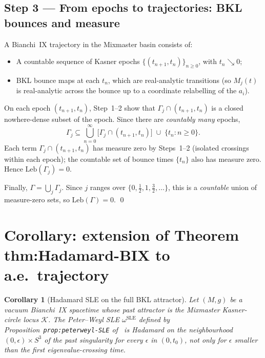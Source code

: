 \documentclass[11pt]{article}
\newtheorem{corollary}[lemma]{Corollary}
\theoremstyle{definition}
\newcommand{\KK}{\mathcal{K}}
\begin{document}
\subsection{Step 3 --- From epochs to trajectories: BKL bounces and measure}

A Bianchi~IX trajectory in the Mixmaster basin consists of:
\begin{itemize}
  \item A countable sequence of Kasner epochs $\{(t_{n+1},t_n)\}_{n\ge 0}$,
    with $t_n \searrow 0$;
  \item BKL bounce maps at each $t_n$, which are real-analytic transitions
    (so $M_j(t)$ is real-analytic across the bounce up to a coordinate
    relabelling of the $a_i$).
\end{itemize}
On each epoch $(t_{n+1},t_n)$, Step~1--2 show that $\Gamma_j \cap (t_{n+1},t_n)$
is a closed nowhere-dense subset of the epoch.  Since there are \emph{countably
many} epochs,
\[
  \Gamma_j \subseteq \bigcup_{n=0}^{\infty}
  \bigl[\Gamma_j \cap (t_{n+1},t_n)\bigr] \;\cup\; \{t_n : n\ge 0\}.
\]
Each term $\Gamma_j \cap (t_{n+1},t_n)$ has measure zero by Steps~1--2
(isolated crossings within each epoch);
the countable set of bounce times $\{t_n\}$ also has measure zero.
Hence $\mathrm{Leb}(\Gamma_j) = 0$.

Finally, $\Gamma = \bigcup_j \Gamma_j$.  Since $j$ ranges over
$\{0,\tfrac{1}{2},1,\tfrac{3}{2},\ldots\}$, this is a \emph{countable} union
of measure-zero sets, so $\mathrm{Leb}(\Gamma) = 0$.  \qed

\section{Corollary: extension of Theorem thm:Hadamard-BIX to a.e.\ trajectory}

\begin{corollary}[Hadamard SLE on the full BKL attractor]\label{cor:Hadamard-ae}
  Let $(M,g)$ be a vacuum Bianchi~IX spacetime whose past attractor is the
  Mixmaster Kasner-circle locus $\KK$.  The Peter--Weyl SLE $\omega^{\mathrm{SLE}}$
  defined by Proposition~\texttt{prop:peterweyl-SLE} of~\cite{note_AWCH_BIX}
  is Hadamard on the neighbourhood $(0,\epsilon)\times S^3$ of the past singularity
  \emph{for every} $\epsilon$ in $(0,t_0)$, not only for $\epsilon$ smaller than the
  first eigenvalue-crossing time.
\end{corollary}
\end{document}
